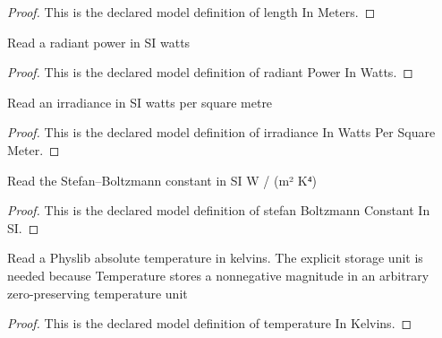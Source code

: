 \begin{proof}
  This is the declared model definition of length In Meters.
\end{proof}
\begin{definition}
  \label{def:physics:phyx-mini-0489:phyxminiproblems-problemphyxmini0489-radiantpowerinwatts}
  Read a radiant power in SI watts
\end{definition}
\begin{proof}
  This is the declared model definition of radiant Power In Watts.
\end{proof}
\begin{definition}
  \label{def:physics:phyx-mini-0489:phyxminiproblems-problemphyxmini0489-irradianceinwattspersquaremeter}
  Read an irradiance in SI watts per square metre
\end{definition}
\begin{proof}
  This is the declared model definition of irradiance In Watts Per Square Meter.
\end{proof}
\begin{definition}
  \label{def:physics:phyx-mini-0489:phyxminiproblems-problemphyxmini0489-stefanboltzmannconstantinsi}
  Read the Stefan--Boltzmann constant in SI W / (m² K⁴)
\end{definition}
\begin{proof}
  This is the declared model definition of stefan Boltzmann Constant In SI.
\end{proof}
\begin{definition}
  \label{def:physics:phyx-mini-0489:phyxminiproblems-problemphyxmini0489-temperatureinkelvins}
  Read a Physlib absolute temperature in kelvins. The explicit storage unit is needed because Temperature stores a nonnegative magnitude in an arbitrary zero-preserving temperature unit
\end{definition}
\begin{proof}
  This is the declared model definition of temperature In Kelvins.
\end{proof}

